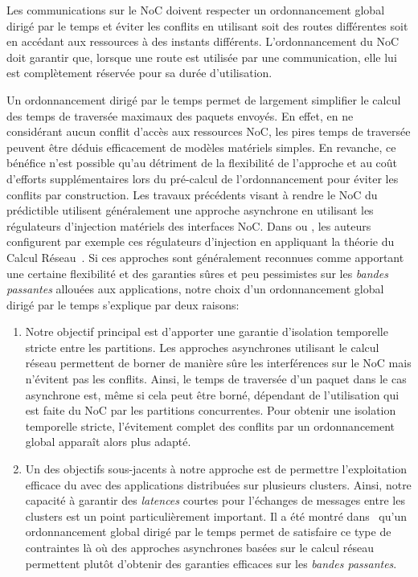 \documentclass[main.tex]{subfiles}
\begin{document}
\begin{regleem}
    \label{em_resumeFr_regle2}
    Les communications sur le NoC doivent respecter un ordonnancement global dirigé par le temps et éviter les conflits en utilisant soit des routes différentes soit en accédant aux ressources à des instants différents. L'ordonnancement du NoC doit garantir que, lorsque une route est utilisée par une communication, elle lui est complètement réservée pour sa durée d'utilisation.
\end{regleem}

Un ordonnancement dirigé par le temps permet de largement simplifier le calcul des temps de traversée maximaux des paquets envoyés. En effet, en ne considérant aucun conflit d'accès aux ressources NoC, les pires temps de traversée peuvent être déduis efficacement de modèles matériels simples. En revanche, ce bénéfice n'est possible qu'au détriment de la flexibilité de l'approche et au coût d'efforts supplémentaires lors du pré-calcul de l'ordonnancement pour éviter les conflits par construction. Les travaux précédents visant à rendre le NoC du \mppalong prédictible utilisent généralement une approche asynchrone en utilisant les régulateurs d'injection matériels des interfaces NoC. Dans \cite{Dinechin2014} ou \cite{Giannopoulou2015}, les auteurs configurent par exemple ces régulateurs d'injection en appliquant la théorie du Calcul Réseau~\cite{LeBoudec2001, Cruz91}. Si ces approches sont généralement reconnues comme apportant une certaine flexibilité et des garanties sûres et peu pessimistes sur les \emph{bandes passantes} allouées aux applications, notre choix d'un ordonnancement global dirigé par le temps s'explique par deux raisons:
\begin{enumerate}
    \item Notre objectif principal est d'apporter une garantie d'isolation temporelle stricte entre les partitions. Les approches asynchrones utilisant le calcul réseau permettent de borner de manière sûre les interférences sur le NoC mais n'évitent pas les conflits. Ainsi, le temps de traversée d'un paquet dans le cas asynchrone est, même si cela peut être borné, dépendant de l'utilisation qui est faite du NoC par les partitions concurrentes. Pour obtenir une isolation temporelle stricte, l'évitement complet des conflits par un ordonnancement global apparaît alors plus adapté.
    \item Un des objectifs sous-jacents à notre approche est de permettre l'exploitation efficace du \mppalong avec des applications distribuées sur plusieurs clusters. Ainsi, notre capacité à garantir des \emph{latences} courtes pour l'échanges de messages entre les clusters est un point particulièrement important. Il a été montré dans~\cite{Puffitsch2015} qu'un ordonnancement global dirigé par le temps permet de satisfaire ce type de contraintes là où des approches asynchrones basées sur le calcul réseau permettent plutôt d'obtenir des garanties efficaces sur les \emph{bandes passantes}.
\end{enumerate}
\end{document}
